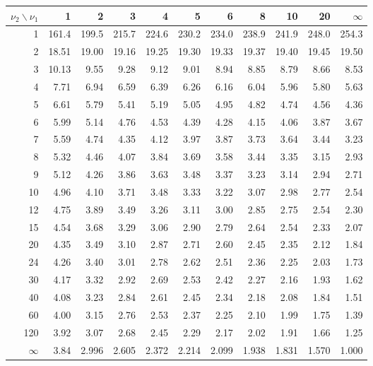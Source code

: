 \begin{center}
\footnotesize
\renewcommand{\arraystretch}{1.12}
\begin{tabular}{r|rrrrrrrrrr}
\hline
$\nu_2 \backslash \nu_1$ & 1 & 2 & 3 & 4 & 5 & 6 & 8 & 10 & 20 & $\infty$ \\
\hline
1  & 161.4 & 199.5 & 215.7 & 224.6 & 230.2 & 234.0 & 238.9 & 241.9 & 248.0 & 254.3 \\
2  & 18.51 & 19.00 & 19.16 & 19.25 & 19.30 & 19.33 & 19.37 & 19.40 & 19.45 & 19.50 \\
3  & 10.13 &  9.55 &  9.28 &  9.12 &  9.01 &  8.94 &  8.85 &  8.79 &  8.66 &  8.53 \\
4  &  7.71 &  6.94 &  6.59 &  6.39 &  6.26 &  6.16 &  6.04 &  5.96 &  5.80 &  5.63 \\
5  &  6.61 &  5.79 &  5.41 &  5.19 &  5.05 &  4.95 &  4.82 &  4.74 &  4.56 &  4.36 \\
6  &  5.99 &  5.14 &  4.76 &  4.53 &  4.39 &  4.28 &  4.15 &  4.06 &  3.87 &  3.67 \\
7  &  5.59 &  4.74 &  4.35 &  4.12 &  3.97 &  3.87 &  3.73 &  3.64 &  3.44 &  3.23 \\
8  &  5.32 &  4.46 &  4.07 &  3.84 &  3.69 &  3.58 &  3.44 &  3.35 &  3.15 &  2.93 \\
9  &  5.12 &  4.26 &  3.86 &  3.63 &  3.48 &  3.37 &  3.23 &  3.14 &  2.94 &  2.71 \\
10 &  4.96 &  4.10 &  3.71 &  3.48 &  3.33 &  3.22 &  3.07 &  2.98 &  2.77 &  2.54 \\
12 &  4.75 &  3.89 &  3.49 &  3.26 &  3.11 &  3.00 &  2.85 &  2.75 &  2.54 &  2.30 \\
15 &  4.54 &  3.68 &  3.29 &  3.06 &  2.90 &  2.79 &  2.64 &  2.54 &  2.33 &  2.07 \\
20 &  4.35 &  3.49 &  3.10 &  2.87 &  2.71 &  2.60 &  2.45 &  2.35 &  2.12 &  1.84 \\
24 &  4.26 &  3.40 &  3.01 &  2.78 &  2.62 &  2.51 &  2.36 &  2.25 &  2.03 &  1.73 \\
30 &  4.17 &  3.32 &  2.92 &  2.69 &  2.53 &  2.42 &  2.27 &  2.16 &  1.93 &  1.62 \\
40 &  4.08 &  3.23 &  2.84 &  2.61 &  2.45 &  2.34 &  2.18 &  2.08 &  1.84 &  1.51 \\
60 &  4.00 &  3.15 &  2.76 &  2.53 &  2.37 &  2.25 &  2.10 &  1.99 &  1.75 &  1.39 \\
120 & 3.92 &  3.07 &  2.68 &  2.45 &  2.29 &  2.17 &  2.02 &  1.91 &  1.66 &  1.25 \\
$\infty$ & 3.84 & 2.996 & 2.605 & 2.372 & 2.214 & 2.099 & 1.938 & 1.831 & 1.570 & 1.000 \\
\hline
\end{tabular}
\end{center}

